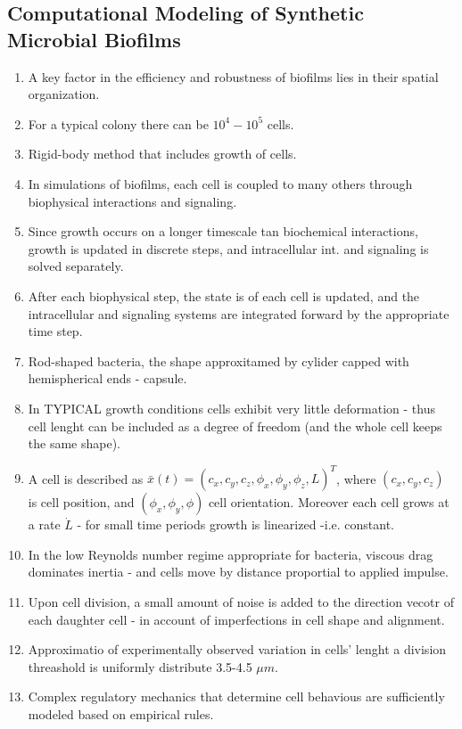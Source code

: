\documentclass[10pt,a4paper]{article}
\begin{document}
\subsection{Computational Modeling of Synthetic Microbial Biofilms \cite{rudge:12}}
\begin{enumerate}
 \item A key factor in the efficiency and robustness of biofilms lies in their spatial organization. 
 \item For a typical colony there can be $10^4-10^5$ cells.
 \item Rigid-body method that includes growth of cells.
 \item In simulations of biofilms, each cell is coupled to many others through biophysical interactions and signaling. 
 \item Since growth occurs on a longer timescale tan biochemical interactions, growth is updated in discrete steps, and intracellular int. and signaling is solved separately.
 \item After each biophysical step, the state is of each cell is updated, and the intracellular and signaling systems are integrated forward by the appropriate time step.
 \item Rod-shaped bacteria, the shape approxitamed by cylider capped with hemispherical ends - capsule.
 \item In TYPICAL growth conditions cells exhibit very little deformation - thus cell lenght can be included as a degree of freedom (and the whole cell keeps the same shape).
 \item A cell is described as $\bar{x}(t) = (c_x, c_y, c_z, \phi_x, \phi_y, \phi_z, L)^T$, where $(c_x, c_y, c_z)$ is cell position, and $(\phi_x, \phi_y, \phi)$ cell orientation.
 Moreover each cell grows at a rate $\dot{L}$ - for small time periods growth is linearized -i.e. constant.
 \item In the low Reynolds number regime appropriate for bacteria, viscous drag dominates inertia - and cells move by distance proportial to applied impulse. 
 \item Upon cell division, a small amount of noise is added to the direction vecotr of each daughter cell - in account of imperfections in cell shape and alignment.
 \item Approximatio of experimentally observed variation in cells' lenght a division threashold is uniformly distribute 3.5-4.5 $\mu m$.
 \item Complex regulatory mechanics that determine cell behavious are sufficiently modeled based on empirical rules. 

\end{enumerate}
\end{document}
